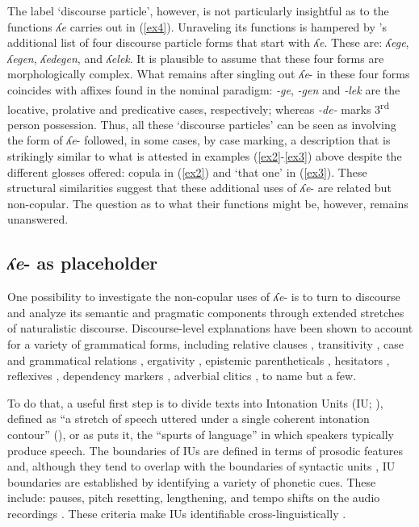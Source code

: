 \documentclass[output=paper,colorlinks,citecolor=brown
\ChapterDOI{10.5281/zenodo.15697581}
]{langscibook}
\begin{document}
The label `discourse particle', however, is not particularly insightful as to the functions \textit{ʎe} carries out in (\ref{ex4}).
Unraveling its functions is hampered by \citet{Nikolaeva_Mayer2004}'s additional list of four discourse particle forms that start with \textit{ʎe}.
These are: \textit{ʎege}, \textit{ʎegen}, \textit{ʎedegen}, and \textit{ʎelek}. 
It is plausible to assume that these four forms are morphologically complex.
What remains after singling out \textit{ʎe}- in these four forms coincides with affixes found in the nominal paradigm: \textit{-ge}, \textit{-gen} and \textit{-lek} are the locative, prolative and predicative cases, respectively; whereas \textit{-de-} marks 3\textsuperscript{rd} person possession. 
Thus, all these `discourse particles' can be seen as involving the form of \textit{ʎe}- followed, in some cases, by case marking, a description that is strikingly similar to what is attested in examples (\ref{ex2}-\ref{ex3}) above despite the different glosses offered: copula in (\ref{ex2}) and `that one' in (\ref{ex3}). 
These structural similarities suggest that these additional uses of \textit{ʎe}- are related but non-copular. 
The question as to what their functions might be, however, remains unanswered.

\subsection{\textit{ʎe}- as placeholder} \label{as-ph}
One possibility to investigate the non-copular uses of \textit{ʎe}- is to turn to discourse and analyze its semantic and pragmatic components through extended stretches of naturalistic discourse.
Discourse-level explanations have been shown to account for a variety of grammatical forms, including relative clauses \citep{Sankoff&Brown1976, Fox&Thompson1990}, transitivity \citep{Hopper&Thompson1980, Thompson&Hopper2001}, case and grammatical relations \citep{Diver1982, Ono-et-al2000}, ergativity \citep{DuBois1987}, epistemic parentheticals \citep{Thompson&Mulac1991}, hesitators \citep{Clark&FoxTree2002}, reflexives \citep{Stern2006}, dependency markers \citep{Mithun2008}, adverbial clitics \citep{Davis2017}, to name but a few. 

To do that, a useful first step is to divide texts into Intonation Units (IU; \citealt{Chafe1979, Chafe1992}), defined as “a stretch of speech uttered under a single coherent intonation contour” (\citealt[47]{DuBoisetal1993}), or as \citet[29]{Chafe1994} puts it, the “spurts of language” in which speakers typically produce speech.
The boundaries of IUs are defined in terms of prosodic features and, although they tend to overlap with the boundaries of syntactic units \citep{DuBois2003, Himmelmann2022}, IU boundaries are established by identifying a variety of phonetic cues. 
These include: pauses, pitch resetting, lengthening, and tempo shifts on the audio recordings \citep{Chafe1992, DuBoisetal1993}.
These criteria make IUs identifiable cross-linguistically \citep{Himmelmann-etal2018, Troiani2023}.
\end{document}
